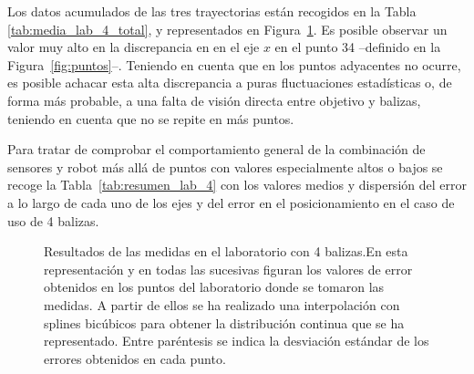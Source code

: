 Los datos acumulados de las tres trayectorias están recogidos en la Tabla \ref{tab:media_lab_4_total}, y representados en Figura~\ref{fig:res_lab}.
Es posible observar un valor muy alto en la discrepancia en en el eje $x$ en el punto 34 --definido en la Figura~\ref{fig:puntos}--.
Teniendo en cuenta que en los puntos adyacentes no ocurre, es posible achacar esta alta discrepancia a puras fluctuaciones estadísticas o, de forma más probable, a una falta de visión directa entre objetivo y balizas, teniendo en cuenta que no se repite en más puntos.

Para tratar de comprobar el comportamiento general de la combinación de sensores y robot más allá de puntos con valores especialmente altos o bajos se recoge la Tabla~\ref{tab:resumen_lab_4} con los valores medios y dispersión del error a lo largo de cada uno de los ejes y del error en el posicionamiento en el caso de uso de 4 balizas.

\begin{figure}[H]
    \centering
    \hspace*{-0.5cm}
    
    \captionsetup{justification=justified}
    \caption{Resultados de las medidas en el laboratorio con 4 balizas.\newline En esta representación y en todas las sucesivas figuran los valores de error obtenidos en los puntos del laboratorio donde se tomaron las medidas. A partir de ellos se ha realizado una interpolación con splines bicúbicos para obtener la distribución continua que se ha representado. Entre paréntesis se indica la desviación estándar de los errores obtenidos en cada punto.}
    \label{fig:res_lab}
\end{figure}


